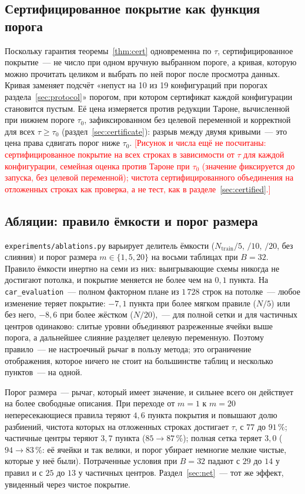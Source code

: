 \documentclass[11pt]{article}
\newcommand{\todo}[1]{\textcolor{red}{[#1]}}
\begin{document}
\subsection{Сертифицированное покрытие как функция порога}\label{sec:taucurve}
Поскольку гарантия теоремы~\ref{thm:cert} одновременна по $\tau$, сертифицированное покрытие~--- не число при одном вручную выбранном пороге, а кривая, которую можно прочитать целиком и выбрать по ней порог после просмотра данных. Кривая заменяет подсчёт «непуст на 10 из 19 конфигураций при порогах раздела~\ref{sec:protocol}» порогом, при котором сертификат каждой конфигурации становится пустым. Её цена измеряется против редукции Тароне, вычисленной при нижнем пороге $\tau_0$, зафиксированном без целевой переменной и корректной для всех $\tau\ge\tau_0$ (раздел~\ref{sec:certificate}): разрыв между двумя кривыми~--- это цена права сдвигать порог ниже $\tau_0$. \todo{Рисунок и числа ещё не посчитаны: сертифицированное покрытие на всех строках в зависимости от $\tau$ для каждой конфигурации, семейная оценка против Тароне при $\tau_0$ (значение фиксируется до запуска, без целевой переменной); чистота сертифицированного объединения на отложенных строках как проверка, а не тест, как в разделе~\ref{sec:certified}.}

\subsection{Абляции: правило ёмкости и порог размера}\label{sec:ablation}
\texttt{experiments/ablations.py} варьирует делитель ёмкости ($N_{\mathrm{train}}/5$, $/10$, $/20$, без слияния) и порог размера $m\in\{1,5,20\}$ на восьми таблицах при $B=32$. Правило ёмкости инертно на семи из них: выигрывающие схемы никогда не достигают потолка, и покрытие меняется не более чем на $0{,}1$ пункта. На \texttt{car\_evaluation}~--- полном факторном плане из $1\,728$ строк на потолке~--- любое изменение теряет покрытие: $-7{,}1$ пункта при более мягком правиле ($N/5$) или без него, $-8{,}6$ при более жёстком ($N/20$),~--- для полной сетки и для частичных центров одинаково: слитые уровни объединяют разреженные ячейки выше порога, а дальнейшее слияние разделяет целевую переменную. Поэтому правило~--- не настроечный рычаг в пользу метода; это ограничение отображения, которое ничего не стоит на большинстве таблиц и несколько пунктов~--- на одной.

Порог размера~--- рычаг, который имеет значение, и сильнее всего он действует на более свободные описания. При переходе от $m=1$ к $m=20$ непересекающиеся правила теряют $4{,}6$ пункта покрытия и повышают долю разбиений, чистота которых на отложенных строках достигает $\tau$, с $77$ до $91\,\%$; частичные центры теряют $3{,}7$ пункта ($85\to87\,\%$); полная сетка теряет $3{,}0$ ($94\to83\,\%$: её ячейки и так велики, и порог убирает немногие мелкие чистые, которые у неё были). Потраченные условия при $B=32$ падают с $29$ до $14$ у правил и с $25$ до $13$ у частичных центров. Раздел~\ref{sec:net}~--- тот же эффект, увиденный через чистое покрытие.
\end{document}
